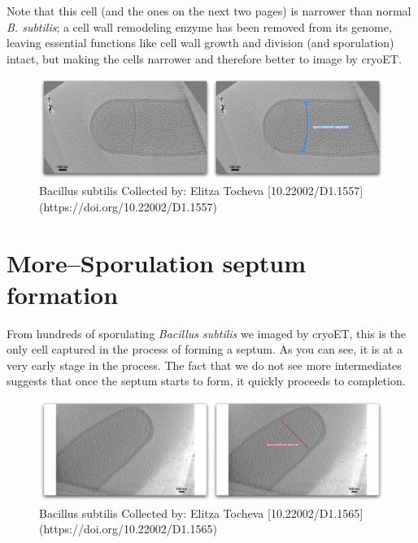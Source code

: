 \documentclass[]{tufte-book}
\begin{document}
Note that this cell (and the ones on the next two pages) is narrower
than normal \emph{B. subtilis}; a cell wall remodeling enzyme has been
removed from its genome, leaving essential functions like cell wall
growth and division (and sporulation) intact, but making the cells
narrower and therefore better to image by cryoET.

\begin{figure}
\includegraphics{movie_stills/8_5} \caption[Bacillus subtilis Collected by]{Bacillus subtilis Collected by: Elitza Tocheva [10.22002/D1.1557](https://doi.org/10.22002/D1.1557)}\label{fig:unnamed-chunk-138}
\end{figure}

\hypertarget{moresporulation-septum-formation}{\section{More--Sporulation
septum formation}\label{moresporulation-septum-formation}}

From hundreds of sporulating \emph{Bacillus subtilis} we imaged by
cryoET, this is the only cell captured in the process of forming a
septum. As you can see, it is at a very early stage in the process. The
fact that we do not see more intermediates suggests that once the septum
starts to form, it quickly proceeds to completion.

\begin{figure}
\includegraphics{movie_stills/8_5a} \caption[Bacillus subtilis Collected by]{Bacillus subtilis Collected by: Elitza Tocheva [10.22002/D1.1565](https://doi.org/10.22002/D1.1565)}\label{fig:unnamed-chunk-139}
\end{figure}
\end{document}
